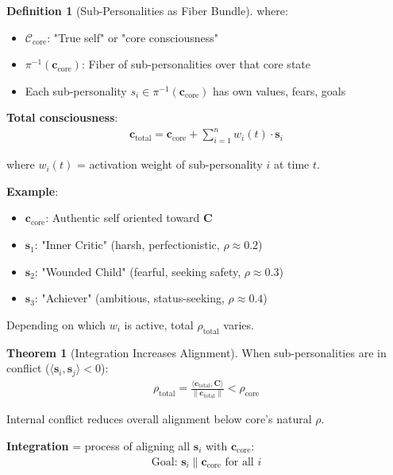 \documentclass[11pt,a4paper]{article}
\theoremstyle{definition}
\newtheorem{definition}{Definition}[section]
\newtheorem{theorem}{Theorem}[section]
\theoremstyle{remark}
\newcommand{\CC}{\mathcal{C}}
\newcommand{\cc}{\mathbf{c}}
\begin{document}
\begin{small}
\begin{enumerate}
\begin{definition}[Sub-Personalities as Fiber Bundle]
where:
\begin{itemize}
    \item \(\CC_{\text{core}}\): "True self" or "core consciousness"
    \item \(\pi^{-1}(\cc_{\text{core}})\): Fiber of sub-personalities over that core state
    \item Each sub-personality \(s_i \in \pi^{-1}(\cc_{\text{core}})\) has own values, fears, goals
\end{itemize}

\textbf{Total consciousness}:
\begin{align}
\cc_{\text{total}} = \cc_{\text{core}} + \sum_{i=1}^n w_i(t) \cdot \mathbf{s}_i
\end{align}

where \(w_i(t)\) = activation weight of sub-personality \(i\) at time \(t\).

\textbf{Example}:
\begin{itemize}
    \item \(\cc_{\text{core}}\): Authentic self oriented toward \(\mathbf{C}\)
    \item \(\mathbf{s}_1\): "Inner Critic" (harsh, perfectionistic, \(\rho \approx 0.2\))
    \item \(\mathbf{s}_2\): "Wounded Child" (fearful, seeking safety, \(\rho \approx 0.3\))
    \item \(\mathbf{s}_3\): "Achiever" (ambitious, status-seeking, \(\rho \approx 0.4\))
\end{itemize}

Depending on which \(w_i\) is active, total \(\rho_{\text{total}}\) varies.
\end{definition}

\begin{theorem}[Integration Increases Alignment]
When sub-personalities are in conflict (\(\langle \mathbf{s}_i, \mathbf{s}_j \rangle < 0\)):
\begin{align}
\rho_{\text{total}} = \frac{\langle \cc_{\text{total}}, \mathbf{C} \rangle}{\|\cc_{\text{total}}\|} < \rho_{\text{core}}
\end{align}

Internal conflict reduces overall alignment below core's natural \(\rho\).

\textbf{Integration} = process of aligning all \(\mathbf{s}_i\) with \(\cc_{\text{core}}\):
\begin{align}
\text{Goal: } \mathbf{s}_i \parallel \cc_{\text{core}} \text{ for all } i
\end{align}


\end{theorem}
\end{enumerate}
\end{small}
\end{document}
